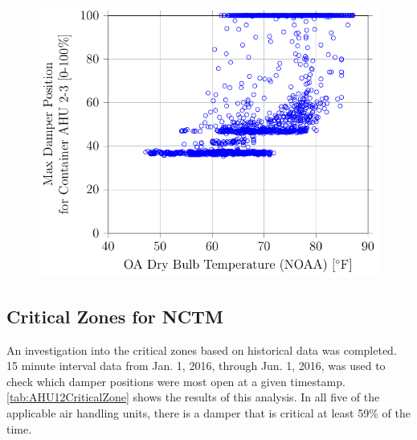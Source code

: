 \begin{figure}
\centering
\includegraphics[]{Plots/2016-06-06-1454-MaxDamperPositionforContainerAHU23vsOADryBulbTemperatureNOAA.pdf}
\caption{}
\label{fig:MaxDamperPositionforContainerAHU23vsOADryBulbTemperatureNOAA}
\end{figure}


\subsection{Critical Zones for NCTM}

An investigation into the critical zones based on historical data was
completed. 15 minute interval data from Jan. 1, 2016, through Jun. 1,
2016, was used to check which damper positions were most open at a given
timestamp. \tableref{} \ref{tab:AHU12CriticalZone} shows the results of
this analysis. In all five of the applicable air handling units, there
is a damper that is critical at least 59\% of the time. 

